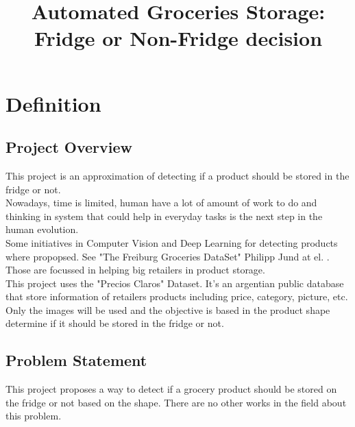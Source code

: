\documentclass[a4paper,10pt]{article}
\title{Automated Groceries Storage: Fridge or Non-Fridge decision}
\begin{document}
\maketitle 

\section{Definition}

\subsection{Project Overview}


This project is an approximation of detecting if a product should be stored in the fridge or not. \\

Nowadays, time is limited, human have a lot of amount of work to do and thinking in system that could help in everyday tasks is the next step in the human evolution.\\

Some initiatives in Computer Vision and Deep Learning for detecting products where propopsed. See "The Freiburg Groceries DataSet" Philipp Jund at el. \cite{freiburgpaper} . Those are focussed in helping big retailers in product storage. \\

This project uses the "Precios Claros" Dataset. It's an argentian public database that store information of retailers products including price, category, picture, etc. Only the images will be used and the objective is based in the product shape determine if it should be stored in the fridge or not.\\


\subsection{Problem Statement}

This project proposes a way to detect if a grocery product should be stored on the fridge or not based on the shape. There are no other works in the field about this problem.\\ 
\end{document}
